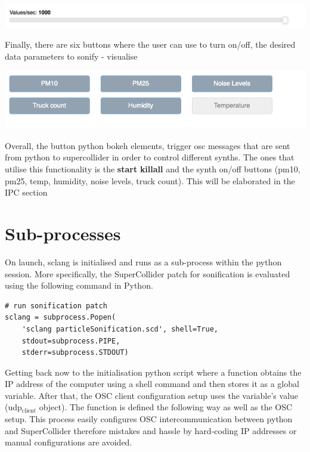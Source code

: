 \documentclass[11pt]{article}
\begin{document}
\begin{center}
\includegraphics[width=.9\linewidth]{./values_sec.png}
\end{center}

Finally, there are six buttons where the user can use to turn on/off, the desired data parameters to sonify - visualise

\begin{center}
\includegraphics[width=.9\linewidth]{./synth_onoff.png}
\end{center}

\vspace{0.5em}

Overall, the button python bokeh elements, trigger osc messages that are sent from python to supercollider in order to control different synths.
The ones that utilise this functionality is the \textbf{start} \textbf{killall} and the synth on/off buttons (pm10, pm25, temp, humidity, noise levels, truck count).
This will be elaborated in the IPC section

\section{Sub-processes}
\label{sec:org76b9c21}
On launch, sclang is initialised and runs as a sub-process within the python session.  More specifically, the SuperCollider  patch for sonification is evaluated using the following command in Python.
\begin{verbatim}
# run sonification patch
sclang = subprocess.Popen(
    'sclang particleSonification.scd', shell=True,
    stdout=subprocess.PIPE,
    stderr=subprocess.STDOUT)
\end{verbatim}
Getting back now to the initialisation python script where a function obtains the IP address of the computer using a shell command and then stores it as a global variable.  After that, the OSC client configuration setup uses the variable's value (udp\(_{\text{client}}\) object).  The function is defined the following way as well as the OSC setup.  This process easily configures OSC intercommunication between python and SuperCollider therefore mistakes and hassle by hard-coding IP addresses or manual configurations are avoided.
\end{document}
